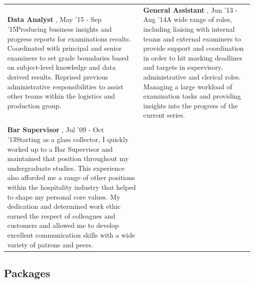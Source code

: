 \documentclass[
]{article}
\begin{document}
\begin{table}[H]
\begin{table}[H]
\begin{tabular}{>{\raggedright\arraybackslash}p{}>{\raggedright\arraybackslash}p{}}
\hspace{1em}\textbf{ Data Analyst }, May '15 - Sep '15\newline Producing business insights and progress reports for examinations results. Coordinated with principal and senior examiners to set grade boundaries based on subject-level knowledge and data derived results. Reprised previous administrative responsibilities to assist other teams within the logistics and production group. & \textbf{ General Assistant }, Jun '13 - Aug '14\newline A wide range of roles, including liaising with internal teams and external examiners to provide support and coordination in order to hit marking deadlines and targets in supervisory, administrative and clerical roles. Managing a large workload of examination tasks and providing insights into the progress of the current series.\\
[0.3em]
\multicolumn{2}{l}{\textit{\textbf{Stocks Tavern}}}\\
\hline
\hspace{1em}\textbf{ Bar Supervisor }, Jul '09 - Oct '13\newline Starting as a glass collector, I quickly worked up to a Bar Supervisor and maintained that position throughout my undergraduate studies. This experience also afforded me a range of other positions within the hospitality industry that helped to shape my personal core values. My dedication and determined work ethic earned the respect of colleagues and customers and allowed me to develop excellent communication skills with a wide variety of patrons and peers. & \\
\bottomrule
\end{tabular}
\endgroup{}
\end{table}
\end{table}

\hypertarget{packages}{%
\subsection{Packages}\label{packages}}
\end{document}
